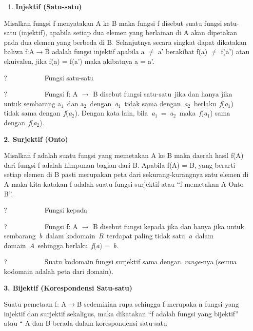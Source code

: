 \documentclass[11pt,fleqn]{book} %
\begin{document}
\begin{enumerate}
\item  \textbf{Injektif (Satu-satu)}
\end{enumerate}

\noindent 

\noindent Misalkan fungsi f menyatakan A ke B maka fungsi f disebut suatu fungsi satu-satu (injektif), apabila setiap dua elemen yang berlainan di A akan dipetakan pada dua elemen yang berbeda di B. Selanjutnya secara singkat dapat dikatakan bahwa f:A$\mathrm{\to}$B adalah fungsi injektif apabila a $\mathrm{\neq}$ a' berakibat f(a) $\mathrm{\neq}$ f(a') atau ekuivalen, jika f(a) = f(a') maka akibatnya a = a'.

\noindent 

\noindent ?~~~~~~~~~~~Fungsi satu-satu

\noindent ?~~~~~~~~~~~Fungsi f: A $\mathrm{\to}$ B disebut fungsi satu-satu~jika dan hanya jika untuk sembarang a${}_{1}$~dan a${}_{2}$~dengan~\textit{a${}_{1}$}~tidak sama dengan~\textit{a${}_{2}$}~berlaku~\textit{f}(\textit{a${}_{1}$}) tidak sama dengan~\textit{f}(\textit{a${}_{2}$}). Dengan kata lain, bila~\textit{a${}_{1}$}~=~\textit{a${}_{2}$}~maka~\textit{f}(\textit{a${}_{1}$}) sama dengan~\textit{f}(\textit{a${}_{2}$}).

\noindent \textbf{2.   Surjektif (Onto)}

\noindent Misalkan f adalah suatu fungsi yang memetakan A ke B maka daerah hasil f(A) dari fungsi f adalah himpunan bagian dari B. Apabila f(A) = B, yang berarti setiap elemen di B pasti merupakan peta dari sekurang-kurangnya satu elemen di A maka kita katakan f adalah suatu fungsi surjektif atau ``f memetakan A Onto B''.

\noindent ?~~~~~~~~~~~Fungsi kepada

\noindent ?~~~~~~~~~~~Fungsi f: A $\mathrm{\to}$ B disebut fungsi kepada jika dan hanya jika untuk sembarang~\textit{b}~dalam kodomain~\textit{B}~terdapat paling tidak satu~\textit{a}~dalam domain~\textit{A}~sehingga berlaku~\textit{f}(\textit{a}) =~\textit{b}.

\noindent ?~~~~~~~~~~~Suatu kodomain fungsi surjektif sama dengan~\textit{range}-nya (semua kodomain adalah peta dari domain).

\noindent 

\noindent \textbf{3. Bijektif (Korespondensi Satu-satu)}

\noindent 

\noindent Suatu pemetaan f: A$\mathrm{\to}$B sedemikian rupa sehingga f merupaka n fungsi yang injektif dan surjektif sekaligus, maka dikatakan ``f adalah fungsi yang bijektif'' atau `` A dan B berada dalam korespondensi satu-satu
\end{document}
